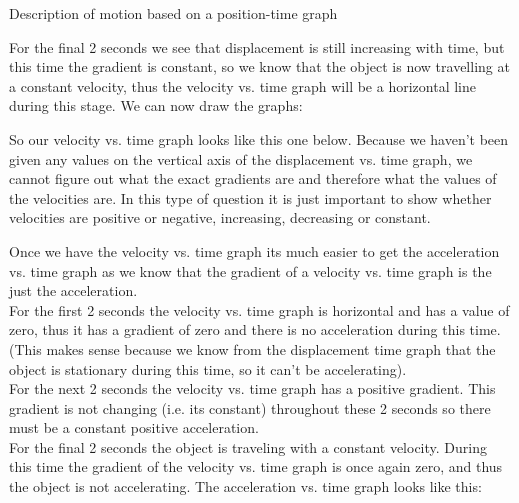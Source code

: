 \begin{wex}{Description of motion based on a position-time graph}
{
For the final 2 seconds we see that displacement is still increasing with time, but this time the gradient is constant, so we know that the object is now travelling at a constant velocity, thus the velocity vs. time graph will be a horizontal line during this stage. We can now draw the graphs:

So our velocity vs. time graph looks like this one below. Because we haven't been given any values on the vertical axis of the displacement vs. time graph, we cannot figure out what the exact gradients are and therefore what the values of the velocities are. In this type of question it is just important to show whether velocities are positive or negative, increasing, decreasing or constant.

\begin{center}
\end{center}

Once we have the velocity vs. time graph its much easier to get the acceleration vs. time graph as we know that the gradient of a velocity vs. time graph is the just the acceleration.\\

For the first 2 seconds the velocity vs. time graph is horizontal and has a value of zero, thus it has a gradient of zero and there is no acceleration during this time. (This makes sense because we know from the displacement time graph that the object is stationary during this time, so it can't be accelerating).\\

For the next 2 seconds the velocity vs. time graph has a positive gradient. This gradient is not changing (i.e. its constant) throughout these 2 seconds so there must be a constant positive acceleration.\\

For the final 2 seconds the object is traveling with a constant velocity. During this time the gradient of the velocity vs. time graph is once again zero, and thus the object is not accelerating.
The acceleration vs. time graph looks like this:

}
\end{wex}
